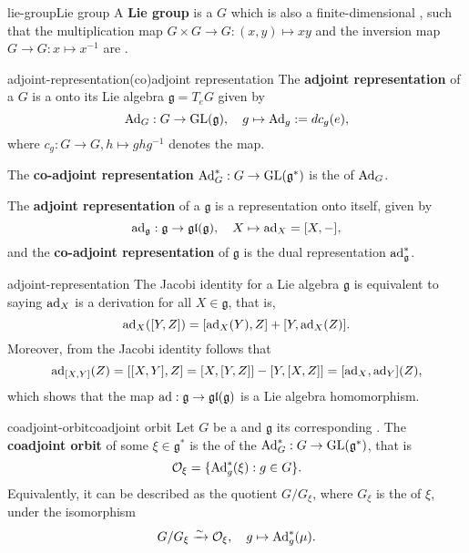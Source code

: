 \begin{topic}{lie-group}{Lie group}
    A \textbf{Lie group} is a  $G$ which is also a finite-dimensional , such that the multiplication map $G \times G \to G : (x, y) \mapsto xy$ and the inversion map $G \to G : x \mapsto x^{-1}$ are .
\end{topic}

\begin{topic}{adjoint-representation}{(co)adjoint representation}
    The \textbf{adjoint representation} of a  $G$ is a  onto its Lie algebra $\mathfrak{g} = T_e G$ given by
    \[ \textup{Ad}_G : G \to \textup{GL}(\mathfrak{g}), \quad g \mapsto \textup{Ad}_g := d c_g(e) , \]
    where $c_g : G \to G, h \mapsto g h g^{-1}$ denotes the  map.
    
    The \textbf{co-adjoint representation} $\textup{Ad}_G^* : G \to \textup{GL}(\mathfrak{g}^*)$ is the  of $\textup{Ad}_G$.
    
    The \textbf{adjoint representation} of a  $\mathfrak{g}$ is a representation onto itself, given by
    \[ \textup{ad}_{\mathfrak{g}}: \mathfrak{g} \to \mathfrak{gl}(\mathfrak{g}), \quad X \mapsto \textup{ad}_X = [X, -] , \]
    and the \textbf{co-adjoint representation} of $\mathfrak{g}$ is the dual representation $\textup{ad}_{\mathfrak{g}}^*$.
\end{topic}

\begin{example}{adjoint-representation}
    The Jacobi identity for a Lie algebra $\mathfrak{g}$ is equivalent to saying $\textup{ad}_X$ is a derivation for all $X \in \mathfrak{g}$, that is,
    \[ \textup{ad}_X([Y, Z]) = [\textup{ad}_X(Y), Z] + [Y, \textup{ad}_X(Z)] . \]
    Moreover, from the Jacobi identity follows that
    \[ \textup{ad}_{[X, Y]}(Z) = [[X, Y], Z] = [X, [Y, Z]] - [Y, [X, Z]] = [\textup{ad}_X, \textup{ad}_Y](Z) , \]
    which shows that the map $\textup{ad} : \mathfrak{g} \to \mathfrak{gl}(\mathfrak{g})$ is a Lie algebra homomorphism.
\end{example}

\begin{topic}{coadjoint-orbit}{coadjoint orbit}
    Let $G$ be a  and $\mathfrak{g}$ its corresponding . The \textbf{coadjoint orbit} of some $\xi \in \mathfrak{g}^*$ is the  of the  $\textup{Ad}^*_G : G \to \textup{GL}(\mathfrak{g}^*)$, that is
    \[ \mathcal{O}_\xi = \{ \textup{Ad}_g^*(\xi) : g \in G \} . \]
    Equivalently, it can be described as the quotient $G/G_\xi$, where $G_\xi$ is the  of $\xi$, under the isomorphism
    \[ G/G_\xi \xrightarrow{\sim} \mathcal{O}_\xi, \quad g \mapsto \textup{Ad}_g^*(\mu) . \]
\end{topic}

